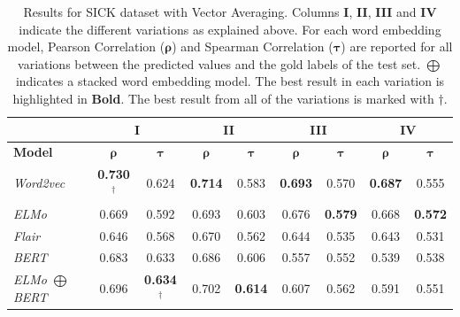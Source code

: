 \begin{enumerate}
\begin{table}[htb]
{\begin{tabular}{|l|cc|cc|cc|cc|}
			\hline & 
			\multicolumn{2}{c|}{\textbf{I}}    & \multicolumn{2}{c|}{\textbf{II}}   & \multicolumn{2}{c|}{\textbf{III}}  &    
			\multicolumn{2}{c|}{\textbf{IV}}   \\ 
			\hline
			\multicolumn{1}{|l|}{\textbf{Model}} 
			& $\bm{\rho}$   & $\bm{\tau}$     
			& $\bm{\rho}$   & $\bm{\tau}$  
			& $\bm{\rho}$   & $\bm{\tau}$  
			& $\bm{\rho}$   & $\bm{\tau}$  
			\\ \hline
			\textit{Word2vec}                  
			& \textbf{0.730}$^{\dagger}$  & 0.624        
			& \textbf{0.714}        & 0.583    
			& \textbf{0.693}        & 0.570    
			& \textbf{0.687}        & 0.555    \\
			\textit{ELMo}                     
			& 0.669                 & 0.592         
			& 0.693                 & 0.603       
			& 0.676                 & \textbf{0.579}  
			& 0.668                 & \textbf{0.572}      \\
			\textit{Flair}                     
			& 0.646                 & 0.568         
			& 0.670                 & 0.562       
			& 0.644                 & 0.535  
			& 0.643                 & 0.531      \\
			\textit{BERT}                     
			& 0.683                 & 0.633         
			& 0.686                 & 0.606       
			& 0.557                 & 0.552  
			& 0.539                 & 0.538 \\
			\textit{ELMo $\bigoplus$ BERT}                     
			& 0.696                 & \textbf{0.634}$^{\dagger}$          
			& 0.702                 & \textbf{0.614}       
			& 0.607                 & 0.562  
			& 0.591                 & 0.551 \\
			\hline
		\end{tabular}
	}
	\caption[Results for SICK with Vector Averaging]{Results for SICK dataset with Vector Averaging. Columns \textbf{I}, \textbf{II}, \textbf{III} and \textbf{IV} indicate the different variations as explained above. For each word embedding model, Pearson Correlation ($\bm{\rho}$) and Spearman Correlation ($\bm{\tau}$) are reported for all variations between the predicted values and the gold labels of the test set. $\bigoplus$ indicates a stacked word embedding model. The best result in each variation is highlighted in \textbf{Bold}. The best result from all of the variations is marked with ${\dagger}$. }  
	\label{tab:sick_average_vectors}
\end{table}

\begin{table}[htb]
	\centering
\end{table}
\end{enumerate}
